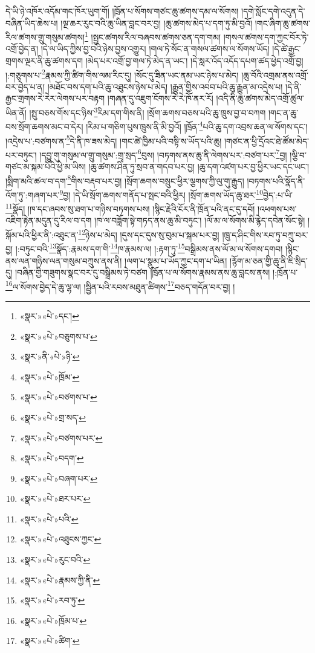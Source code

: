 དེ་ཡི་ཉེ་འཁོར་འདོམ་གང་ཁོར་ཡུག་གོ། །ཁྲོན་པ་སོགས་གཙང་ཆུ་ཚགས་དམ་ལ་སོགས། །དགེ་སློང་དགེ་འདུན་དེ་བཞིན་ཡིད་ཆེས་པ། །ལྔ་ཆར་རུང་བའི་ཆུ་ཡིན་བླང་བར་བྱ། །ཆུ་ཚགས་མེད་པ་དག་ཏུ་མི་བྱའོ། །གང་ཞིག་ཆུ་ཚགས་རིལ་ཚགས་གྲུ་གསུམ་ཚགས།\footnote{«སྣར་»«པེ་»དང་།} །སྤྱང་ཚགས་རིལ་བཞབས་ཚགས་ཅན་དག་གམ། །གསལ་ཚགས་དག་ཀྱང་བོར་ཏེ་འགྲོ་བྱེད་ན། །དེ་ལ་ཡིད་ཀྱིས་བྱ་བའི་ཉེས་བྱས་འགྱུར། །གལ་ཏེ་སོང་ན་གསལ་ཚགས་ལ་སོགས་ཡོད། །དེ་ཚེ་རྒྱང་གྲགས་ལྔར་ནི་ཆུ་ཚགས་དག །མེད་པར་འགྲོ་བྱ་གལ་ཏེ་མེད་ན་ཡང་། །དེ་སླར་འོད་འདོད་དཔག་ཚད་ཕྱེད་འགྲོ་བྱ། །:གཅུགས་པ་\footnote{«སྣར་»«པེ་»བཅུགས་པ་}རྣམས་ཀྱི་ཚིག་གིས་ལམ་རིང་དུ། །སོང་དུ་ཟིན་ཡང་ནམ་ཡང་ཉེས་པ་མེད། །ཆུ་བོའི་འགྲམ་ནས་འགྲོ་བར་བྱེད་པ་ན། །མཐོང་བས་དག་པའི་ཆུ་འཐུངས་ཉེས་པ་མེད། །རྒྱུན་གྱིས་འབབ་པའི་ཆུ་རྒྱུན་མ་འདྲེས་པ། །དེ་ནི་རྒྱང་གྲགས་རེ་རེར་ལེགས་པར་བརྟག །གཞན་དུ་འཇུག་ངོགས་རེ་རེ་ཁོ་ནར་རོ། །འདི་ནི་ཆུ་ཚགས་མེད་འགྲོ་ཚུལ་ཡིན་ནོ། །སྤུ་བཅས་གོས་དང་ཉིས་\footnote{«སྣར་»ནི་«པེ་»ཉི་}རིམ་དག་གིས་ནི། །སྲོག་ཆགས་བཅས་པའི་ཆུ་ཁྲུས་བྱ་བ་བཀག །གང་ན་ཆུ་བས་སྲོག་ཆགས་མང་བ་དེར། །རིམ་པ་གཅིག་པུས་ཁྲུས་ནི་མི་བྱའོ། །ཁྲོན་\footnote{«སྣར་»«པེ་»ཁྲོམ་}པའི་ཆུ་དག་འབྲས་ཆན་ལ་སོགས་དང་། །འདྲེས་པ་:བཙགས་ན་\footnote{«སྣར་»«པེ་»བཙགས་པ་}དེ་ནི་ཁ་ཟས་མེད། །གང་ཚེ་ཁྱིམ་པའི་བསྟི་ས་ཡོད་པའི་ཆུ། །གཙང་ན་ཕྱི་དྲོའང་ཐེ་ཚོམ་མེད་པར་བཏུང་། །དབྱུ་གུ་གསུམ་ལ་གྲུ་གསུམ་:གྲྭ་སྲད་\footnote{«སྣར་»«པེ་»གྲ་སད་}བུས། །བཏགས་ནས་ཆུ་ནི་ལེགས་པར་:བཙག་པར་\footnote{«སྣར་»«པེ་»བཙགས་པར་}བྱ། །ལྕི་བ་གཙང་མ་སྐམ་པོའི་ཕྱེ་མ་ཡིས། །ཆུ་ཚགས་ཤིན་ཏུ་སྲབ་ན་གདབ་པར་བྱ། །ཆུ་དག་འཛག་པར་བྱ་ཕྱིར་ཡང་དང་ཡང་། །སྨིག་མའི་ཚལ་བ་དག་\footnote{«སྣར་»«པེ་»བདག་}གིས་བརྡབ་པར་བྱ། །སྲོག་ཆགས་བསྲུང་ཕྱིར་ལྕགས་ཀྱི་ལུ་གུ་རྒྱུད། །བཏགས་པའི་སྣོད་ནི་འོག་ཏུ་:གཞག་པར་\footnote{«སྣར་»«པེ་»བཞག་པར་}བྱ། །དེ་ཡི་སྲོག་ཆགས་གནོད་པ་སྤང་བའི་ཕྱིར། །སྲོག་ཆགས་ཡོད་ཆུ་ཐར་\footnote{«སྣར་»«པེ་»ཐར་པར་}བྱེད་:པ་ཡི་\footnote{«སྣར་»«པེ་»པའི་}སྣོད། །ཁ་དང་ཞབས་སུ་ཐག་པ་གཉིས་བཏགས་པས། །སྙིང་རྗེའི་ངོར་ནི་ཁྲོན་པའི་ནང་དུ་དབོ། །འཕགས་པས་འཇིག་རྟེན་མདུན་དུ་རིལ་བ་དག །ཁ་ལ་བཟློག་སྟེ་གཏད་ནས་ཆུ་མི་བཏུང་། །ལོ་མ་ལ་སོགས་མི་རྙེད་དབེན་སོང་སྟེ། །སྐོམ་པའི་ཕྱིར་ནི་:འཐུང་ན་\footnote{«སྣར་»«པེ་»འཐུངས་ཀྱང་}ཉེས་པ་མེད། །དུས་དང་དུས་སུ་བུམ་པ་སྐམ་པར་བྱ། །ཁྲུ་ད་ཤིང་གིས་རབ་ཏུ་བཀྲུ་བར་བྱ། །:བཏུང་བའི་\footnote{«སྣར་»«པེ་»རུང་བའི་}སྣོད་:རྣམས་དག་གི་\footnote{«སྣར་»«པེ་»རྣམས་ཀྱི་ནི་}ཁ་རྣམས་ལ། །:རྟག་ཏུ་\footnote{«སྣར་»«པེ་»རབ་ཏུ་}བསྒྲིམས་ནས་ལོ་མ་ལ་སོགས་དགབ། །སྙིང་ནས་ལན་གཉིས་ལན་གསུམ་བཀྲུས་ནས་ནི། །ལག་པ་སྣུམ་པ་ཡོད་ཀྱང་དག་པ་ཡིན། །རྙོག་མ་ཅན་གྱི་ཆུ་ནི་ཇི་སྲིད་དུ། །བཞིན་གྱི་གཟུགས་སྣང་བར་དུ་བསྒྲིམས་ཏེ་བཙག །ཁྲོན་པ་ལ་སོགས་རྣམས་ནས་ཆུ་བླངས་ནས། །:ཁྲོན་པ་\footnote{«སྣར་»«པེ་»ཁྲོམ་པ་}ལ་སོགས་བྱེད་དེ་ཆུ་ལྷ་ལ། །སྦྱིན་པའི་རབས་མཐུན་ཚིགས་\footnote{«སྣར་»«པེ་»ཚིག་}བཅད་གདོན་བར་བྱ། །
